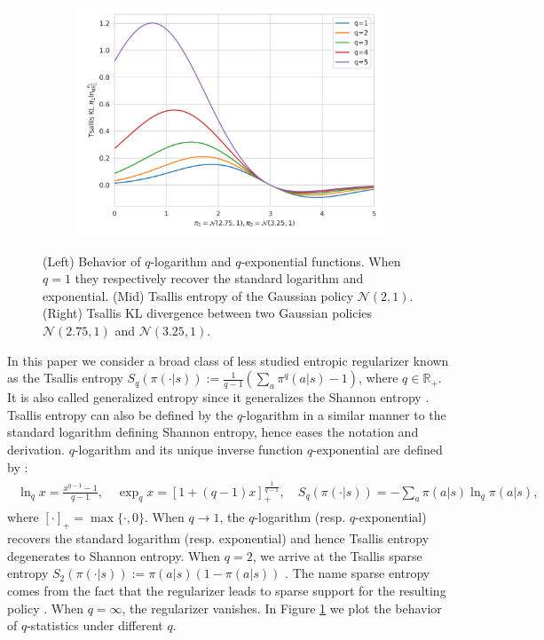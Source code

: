 \documentclass{article}
\newcommand{\AdaBracket}[1]{\left(#1\right)}
\newcommand{\AdaRectBracket}[1]{\left[#1\right]}
\newcommand{\qlog}{$q$-logarithm }
\newcommand{\tsallis}[1]{S_q(#1)}
\newcommand{\logq}[1]{\ln_{q}\!#1}
\newcommand{\expq}[1]{\exp_{q}\!#1}
\begin{document}
\begin{figure}
    \begin{subfigure}[b]{0.3\textwidth}
        \includegraphics[width=\textwidth]{img/tsallis_kl.png}
    \end{subfigure}
    \caption{(Left) Behavior of \qlog and $q$-exponential functions.
    When $q=1$ they respectively recover the standard logarithm and exponential.
    (Mid) Tsallis entropy of the Gaussian policy $\mathcal{N}(2, 1)$. (Right) Tsallis KL divergence between two Gaussian policies $\mathcal{N}(2.75, 1)$ and $\mathcal{N}(3.25, 1)$.
    }
    \label{fig:q_stats}
\end{figure}

In this paper we consider a broad class of less studied entropic regularizer known as the Tsallis entropy $S_q(\pi(\cdot|s)):= \frac{1}{q-1} \AdaBracket{\sum_a \pi^q(a|s) - 1}$, where $q \in \mathbb{R}_{+}$.
It is also called generalized entropy since it generalizes the Shannon entropy \cite{TsallisEntropy,tsallis2009introduction}.
Tsallis entropy can also be defined by the \qlog in a similar manner to the standard logarithm defining Shannon entropy, hence eases the notation and derivation.
\qlog and its unique inverse function $q$-exponential are defined by \cite{tsallis2009introduction}:
\begin{align}
    \begin{split}
        \logq{x} = \frac{x^{q-1} - 1}{q-1}, \quad \expq{x} = \AdaRectBracket{1 + (q - 1)x}^{\frac{1}{q-1}}_{+}, \quad \tsallis{\pi(\cdot|s)} = -\sum_{a}{\pi(a|s)}{\logq{\pi(a|s)}},
    \end{split}
\end{align}
where $[\cdot]_{+} = \max \{\cdot, 0\}$.
When $q\rightarrow 1$, the \qlog (resp. $q$-exponential) recovers the standard logarithm (resp. exponential) and hence Tsallis entropy degenerates to Shannon entropy.
When $q=2$, we arrive at the Tsallis sparse entropy 
$S_2(\pi(\cdot | s)):= \pi(a|s)\AdaBracket{1 - \pi(a|s)}$ \cite{Nachum18a-tsallis,Lee2018-TsallisRAL}. 
The name sparse entropy comes from the fact that the regularizer leads to sparse support for the resulting policy \cite{Blondel-2020LearningFenchelYoundLoss,Martins16-sparsemax}.
When $q=\infty$, the regularizer vanishes.
In Figure \ref{fig:q_stats} we plot the behavior of $q$-statistics under different $q$.
\end{document}
